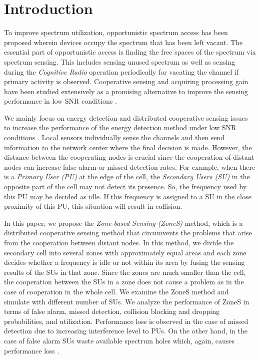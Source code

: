\documentclass[conference,compsoc]{IEEEtran}
\begin{document}
\IEEEpeerreviewmaketitle



\section{Introduction}
To improve spectrum utilization, opportunistic spectrum access has been proposed wherein devices occupy the spectrum that has been left vacant. The essential part of opportunistic access is finding the free spaces of the spectrum via spectrum sensing. This includes sensing unused spectrum as well as sensing during the \emph{Cognitive Radio} operation periodically for vacating the channel if primary activity is observed. Cooperative sensing and acquiring processing gain have been studied extensively as a promising alternative to improve the sensing performance in low SNR conditions \cite{ganesan2005css, kattepur2007data, quan2008spatial, quan2009optimal, unnikrishnan2008csp, aysal2008cooperative}.

We mainly focus on energy detection and distributed cooperative sensing issues to increase the performance of the energy detection method under low SNR conditions \cite{sensingReview2011}. Local sensors individually sense the channels and then send information to the network center where the final decision is made\cite{crSensingCDMA2010}. However, the distance between the cooperating nodes is crucial since the cooperation of distant nodes can increase false alarm or missed detection rates. For example, when there is a \textit{Primary User (PU)} at the edge of the cell, the \textit{Secondary Users (SU)} in the opposite part of the cell may not detect its presence. So, the frequency used by this PU may be decided as idle. If this frequency is assigned to a SU in the close proximity of this PU, this situation will result in collision.

In this paper, we propose the \textit{Zone-based Sensing (ZoneS)} method, which is a distributed cooperative sensing method that circumvents the problems that arise from the cooperation between distant nodes. In this method, we divide the secondary cell into several zones with approximately equal areas and each zone decides whether a frequency is idle or not within its area by fusing the sensing results of the SUs in that zone. Since the zones are much smaller than the cell, the cooperation between the SUs in a zone does not cause a problem as in the case of cooperation in the whole cell. We examine the ZoneS method and simulate with different number of SUs. We analyze the performance of ZoneS in terms of false alarm, missed detection, collision blocking and dropping probabilities, and utilization. Performance loss is observed in the case of missed detection due to increasing interference level to PUs. On the other hand, in the case of false alarm SUs waste available spectrum holes which, again, causes performance loss \cite{parameterOptimization}.
\end{document}
